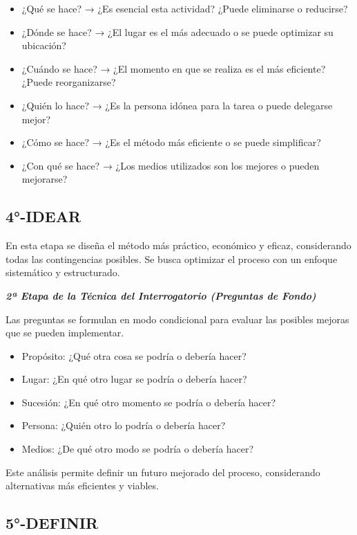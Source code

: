 \documentclass[a4paper,oneside,11pt]{article}
\begin{document}
\begin{itemize}
    \item ¿Qué se hace? → ¿Es esencial esta actividad? ¿Puede eliminarse o reducirse?
    \item ¿Dónde se hace? → ¿El lugar es el más adecuado o se puede optimizar su ubicación?
    \item ¿Cuándo se hace? → ¿El momento en que se realiza es el más eficiente? ¿Puede reorganizarse?
    \item ¿Quién lo hace? → ¿Es la persona idónea para la tarea o puede delegarse mejor?
    \item ¿Cómo se hace? → ¿Es el método más eficiente o se puede simplificar?
    \item ¿Con qué se hace? → ¿Los medios utilizados son los mejores o pueden mejorarse?
\end{itemize}

\subsection{4°-IDEAR}

En esta etapa se diseña el método más práctico, económico y eficaz, considerando todas las contingencias posibles. Se busca optimizar el proceso con un enfoque sistemático y estructurado.

\textbf{\textit{2ª Etapa de la Técnica del Interrogatorio (Preguntas de Fondo)}}

Las preguntas se formulan en modo condicional para evaluar las posibles mejoras que se pueden implementar.
\begin{itemize}
    \item Propósito: ¿Qué otra cosa se podría o debería hacer?
    \item Lugar: ¿En qué otro lugar se podría o debería hacer?
    \item Sucesión: ¿En qué otro momento se podría o debería hacer?
    \item Persona: ¿Quién otro lo podría o debería hacer?
    \item Medios: ¿De qué otro modo se podría o debería hacer?
\end{itemize}

Este análisis permite definir un futuro mejorado del proceso, considerando alternativas más eficientes y viables.

\subsection{5°-DEFINIR}
\end{document}
